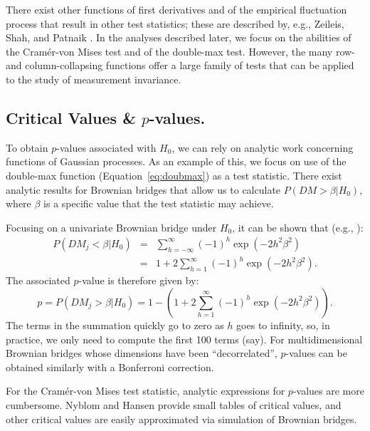 \documentclass[man]{apa}
\begin{document}
There exist other functions of first derivatives and of the
empirical fluctuation process that
result in other test statistics; these are described by, e.g.,
Zeileis, Shah, and Patnaik \citeyear{ZeiSha10}.  
In the analyses described later, we focus on the abilities
of the Cram\'{e}r-von Mises test and of the double-max test.  However,
the many 
row- and column-collapsing functions offer a large family of tests
that can be applied to the study of measurement invariance.

\subsection{Critical Values \& $p$-values.}
To obtain $p$-values associated with $H_0$, we can rely on analytic
work concerning functions of Gaussian processes.
As an example of this, we focus on use of the 
double-max function (Equation~\eqref{eq:doubmax}) as a test statistic.
There exist 
analytic results for Brownian bridges that allow us to calculate
$P(DM > \beta | H_0)$, where $\beta$ is a specific value
that the test statistic may achieve.  

Focusing on a univariate
Brownian bridge under $H_0$, it can be shown that (e.g., ):
\begin{eqnarray}
    P(DM_j < \beta | H_0) &
    = & \sum_{h=-\infty}^{\infty} (-1)^h \exp(-2h^2\beta^2) \\
   & = & 1 + 2 \sum_{h=1}^{\infty} (-1)^h \exp(-2h^2\beta^2).
\end{eqnarray}
The associated $p$-value is therefore given by:
\begin{equation}
    \label{eq:absmax_p}
        p = P(DM_j > \beta | H_0)
    = 1 - (1 + 2 \sum_{h=1}^{\infty} (-1)^h \exp(-2h^2\beta^2)).
\end{equation}
The terms in the summation quickly go to zero as $h$ goes to infinity,
so, in practice, we only need to compute the first 100 terms (say).
For multidimensional Brownian bridges whose dimensions have been
``decorrelated'', $p$-values can
be obtained similarly with a Bonferroni correction.

For the Cram\'{e}r-von Mises test statistic, analytic expressions for
$p$-values are more cumbersome.  Nyblom \citeyear{Nyb89} and Hansen
\citeyear{Han92} provide small tables of critical values, and other
critical values are easily approximated via simulation of Brownian
bridges.
\end{document}
